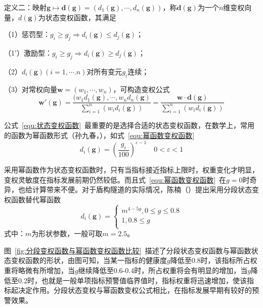 定义二：映射$\mathbf{g}\mapsto \mathbf{d}(\mathbf{g})=({{d}_{1}}(\mathbf{g}),\cdots ,{{d}_{n}}(\mathbf{g}))$，称$\mathbf{d}(\mathbf{g})$为一个$n$维变权向量，${d}(\mathbf{g})$为状态变权函数，其满足

（1）惩罚型：${{g}_{i}}\ge {{g}_{j}}\Rightarrow {{d}_{i}}(\mathbf{g})\le {{d}_{j}}(\mathbf{g})$；

（1'）激励型：${{g}_{i}}\ge {{g}_{j}}\Rightarrow {{d}_{i}}(\mathbf{g})\ge {{d}_{j}}(\mathbf{g})$；

（2）${{d}_{i}}(\mathbf{g})(i=1,\cdots .n)$对所有变元$g_i$连续；

（3）对常权向量$\mathbf{w}=({{w}_{1}},\cdots ,{{w}_{n}})$，可构造变权公式
\begin{equation}
    \label{equ:状态变权函数}
    \mathbf{{w}'}(\mathbf{g})=\frac{({{w}_{1}}{{d}_{1}}(\mathbf{g}),\cdots ,{{w}_{n}}{{d}_{n}}(\mathbf{g})}{\sum\limits_{i=1}^{n}{({{w}_{i}}{{d}_{i}}(\mathbf{g}))}}=\frac{\mathbf{w}\cdot \mathbf{d}(\mathbf{g})}{\sum\limits_{i=1}^{n}{({{w}_{i}}{{d}_{i}}(\mathbf{g}))}}
\end{equation}

公式~\ref{equ:状态变权函数}~最重要的是选择合适的状态变权函数，在数学上，常用的函数为幂函数形式（孙九春，\citeyear{孙九春2002大型桥梁综合评估系统研究}），如式~\ref{equ:幂函数变权函数}
\begin{equation}
    \label{equ:幂函数变权函数}
    {{d}_{i}}(\mathbf{g})={{(\frac{{{g}_{i}}}{100})}^{\varepsilon -1}}\quad 0<\varepsilon <1
\end{equation}

采用幂函数作为状态变权函数时，只有当指标接近指标上限时，权重变化才明显，变权灵敏度在指标发展前期仍然较低。而且式~\ref{equ:幂函数变权函数}~在$g=0$时奇异，也给计算带来不便。对于盾构隧道的实际情况，陈楠（\citeyear{陈楠2017考虑发展趋势与指标关联的隧道结构健康评估方法研究}）提出采用分段状态变权函数替代幂函数
\begin{equation}
    \label{equ:分段状态变权函数}
    {{d}_{i}}(\mathbf{g})=\left\{ \begin{array}{*{35}{l}}
   {{m}^{4-5g}},0\le g\le 0.8  \\
   1,0.8\le g  \\
\end{array} \right.
\end{equation}
式中：$m$为形状参数，一般可取$m=2.5$。

图~\ref{fig:分段变权函数与幂函数变权函数比较}~描述了分段状态变权函数与幂函数状态变权函数的形状，由图可知，当某一指标的健康度$g$降低至0.8时，该指标所占权重将略微有所增加，当$g$继续降低至0.6-0.4时，所占权重将会有明显的增加，当$g$降低至0.2时，也就是一般单项指标预警值临界值时，指标权重将迅速增加，使该指标起决定作用。分段状态变权与幂函数变权公式相比，在指标发展早期有较好的预警效果。

